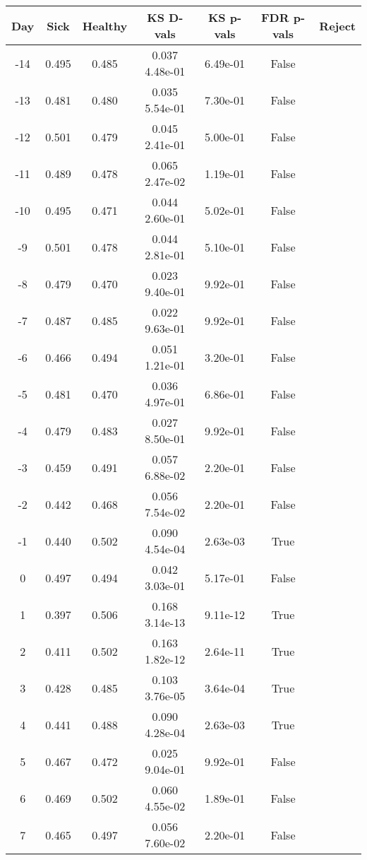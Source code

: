 \begin{tabular}{c|c|c|c|c|c|c}
Day &  Sick & Healthy &  KS D-vals &  KS p-vals & FDR p-vals & Reject\\
\hline
-14 & 0.495 &   0.485 &   0.037   4.48e-01 &   6.49e-01 &  False\\
-13 & 0.481 &   0.480 &   0.035   5.54e-01 &   7.30e-01 &  False\\
-12 & 0.501 &   0.479 &   0.045   2.41e-01 &   5.00e-01 &  False\\
-11 & 0.489 &   0.478 &   0.065   2.47e-02 &   1.19e-01 &  False\\
-10 & 0.495 &   0.471 &   0.044   2.60e-01 &   5.02e-01 &  False\\
 -9 & 0.501 &   0.478 &   0.044   2.81e-01 &   5.10e-01 &  False\\
 -8 & 0.479 &   0.470 &   0.023   9.40e-01 &   9.92e-01 &  False\\
 -7 & 0.487 &   0.485 &   0.022   9.63e-01 &   9.92e-01 &  False\\
 -6 & 0.466 &   0.494 &   0.051   1.21e-01 &   3.20e-01 &  False\\
 -5 & 0.481 &   0.470 &   0.036   4.97e-01 &   6.86e-01 &  False\\
 -4 & 0.479 &   0.483 &   0.027   8.50e-01 &   9.92e-01 &  False\\
 -3 & 0.459 &   0.491 &   0.057   6.88e-02 &   2.20e-01 &  False\\
 -2 & 0.442 &   0.468 &   0.056   7.54e-02 &   2.20e-01 &  False\\
 -1 & 0.440 &   0.502 &   0.090   4.54e-04 &   2.63e-03 &   True\\
  0 & 0.497 &   0.494 &   0.042   3.03e-01 &   5.17e-01 &  False\\
  1 & 0.397 &   0.506 &   0.168   3.14e-13 &   9.11e-12 &   True\\
  2 & 0.411 &   0.502 &   0.163   1.82e-12 &   2.64e-11 &   True\\
  3 & 0.428 &   0.485 &   0.103   3.76e-05 &   3.64e-04 &   True\\
  4 & 0.441 &   0.488 &   0.090   4.28e-04 &   2.63e-03 &   True\\
  5 & 0.467 &   0.472 &   0.025   9.04e-01 &   9.92e-01 &  False\\
  6 & 0.469 &   0.502 &   0.060   4.55e-02 &   1.89e-01 &  False\\
  7 & 0.465 &   0.497 &   0.056   7.60e-02 &   2.20e-01 &  False\\

\end{tabular}
